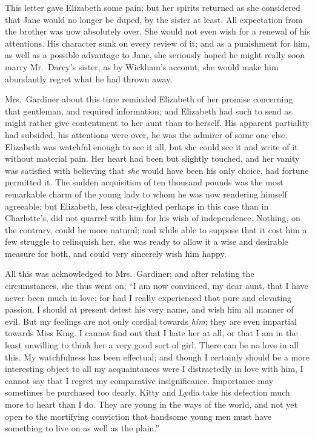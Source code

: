 This letter gave Elizabeth some pain; but her spirits returned as
she considered that Jane would no longer be duped, by the sister
at least.  All expectation from the brother was now absolutely
over.  She would not even wish for a renewal of his attentions.
His character sunk on every review of it; and as a punishment for
him, as well as a possible advantage to Jane, she seriously hoped
he might really soon marry Mr.\ Darcy's sister, as by Wickham's
account, she would make him abundantly regret what he had
thrown away.

Mrs.\ Gardiner about this time reminded Elizabeth of her promise
concerning that gentleman, and required information; and
Elizabeth had such to send as might rather give contentment to
her aunt than to herself.  His apparent partiality had subsided,
his attentions were over, he was the admirer of some one else.
Elizabeth was watchful enough to see it all, but she could see it
and write of it without material pain.  Her heart had been but
slightly touched, and her vanity was satisfied with believing that
\emph{she} would have been his only choice, had fortune permitted it.
The sudden acquisition of ten thousand pounds was the most
remarkable charm of the young lady to whom he was now rendering
himself agreeable; but Elizabeth, less clear-sighted perhaps in
this case than in Charlotte's, did not quarrel with him for his
wish of independence.  Nothing, on the contrary, could be more
natural; and while able to suppose that it cost him a few struggle
to relinquish her, she was ready to allow it a wise and desirable
measure for both, and could very sincerely wish him happy.

All this was acknowledged to Mrs.\ Gardiner; and after relating
the circumstances, she thus went on: ``I am now convinced, my
dear aunt, that I have never been much in love; for had I really
experienced that pure and elevating passion, I should at present
detest his very name, and wish him all manner of evil.  But my
feelings are not only cordial towards \emph{him}; they are even
impartial towards Miss King.  I cannot find out that I hate her at
all, or that I am in the least unwilling to think her a very good
sort of girl.  There can be no love in all this.  My watchfulness
has been effectual; and though I certainly should be a more
interesting object to all my acquaintances were I distractedly
in love with him, I cannot say that I regret my comparative
insignificance.  Importance may sometimes be purchased too
dearly.  Kitty and Lydia take his defection much more to heart
than I do.  They are young in the ways of the world, and not
yet open to the mortifying conviction that handsome young men
must have something to live on as well as the plain.''



